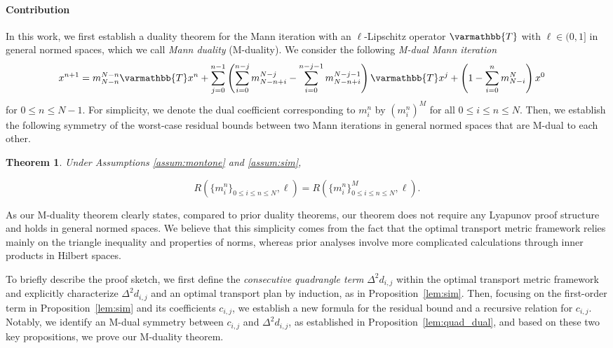 \documentclass[pdflatex,sn-mathphys-num]{sn-jnl}%
\newcommand{\opT}{{\varmathbb{T}}}
\theoremstyle{thmstyleone}%
\newtheorem{theorem}{Theorem}%
\theoremstyle{thmstyletwo}%
\theoremstyle{thmstylethree}%
\begin{document}
\paragraph{Contribution} In this work, we first establish a duality theorem for the Mann iteration with an $\ell$-Lipschitz operator $\opT$ with $\ell \in (0,1]$ in general normed spaces, which we call \emph{Mann duality} (M-duality). We consider the following \emph{M-dual Mann iteration}
\begin{align*}
x^{n+1}
={}& m^{\tiny{N-n}}_{N-n} \opT x^n+ \sum^{n-1}_{j=0}
\left(
\sum^{n-j}_{i=0} m^{N-j}_{N-n+i}
-
\sum^{n-j-1}_{i=0}m^{N-j-1}_{N-n+i}
\right)\opT x^{j}
+
\left(1-\sum^n_{i=0}m^{N}_{N-i}\right)x^0
\end{align*}
for $0 \le n \le N-1$. For simplicity, we denote the dual coefficient corresponding to $m_i^n$ by $(m_i^n)^M$ for all $0 \le i\le n \le N$. Then, we establish the following symmetry of the worst-case residual bounds between two Mann iterations in general normed spaces that are M-dual to each other.
\begin{theorem}\label{thm:m-dual}
    Under Assumptions \ref{assum:montone} and
    \ref{assum:sim},
    
    \[R(\{m^n_i\}_{0 \le i \le n \le N}, \ell)
    =
    R(\{m^n_i\}^M_{0 \le i \le n \le N}, \ell).\]
\end{theorem}
\noindent
As our M-duality theorem clearly states, compared to prior duality theorems, our theorem does not require any Lyapunov proof structure and holds in general normed spaces. We believe that this simplicity comes from the fact that the optimal transport metric framework relies mainly on the triangle inequality and properties of norms, whereas prior analyses involve more complicated calculations through inner products in Hilbert spaces. 

To briefly describe the proof sketch, we first define the \emph{consecutive quadrangle term} $\Delta^2 d_{i,j}$ within the optimal transport metric framework and explicitly characterize $\Delta^2 d_{i,j}$ and an optimal transport plan by induction, as in Proposition~\ref{lem:sim}. Then, focusing on the first-order term in Proposition~\ref{lem:sim} and its coefficients $c_{i,j}$, we establish a new formula for the residual bound and a recursive relation for $c_{i,j}$. Notably, we identify an M-dual symmetry between $c_{i,j}$ and $\Delta^2 d_{i,j}$, as established in Proposition~\ref{lem:quad_dual}, and  based on these two key propositions, we prove our M-duality theorem.
\end{document}
